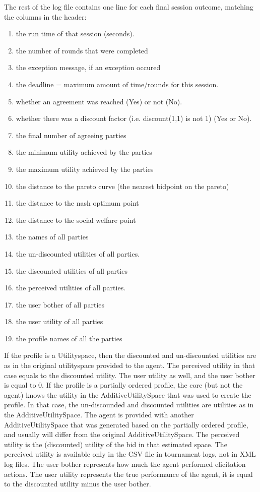 \documentclass[]{llncs}
\begin{document}
The rest of the log file contains one line for each final session outcome, matching the columns in the header:

\begin{enumerate}
\item the run time of that session (seconds). 
\item the number of rounds that were completed
\item the exception message, if an exception occured
\item the deadline = maximum amount of time/rounds for this session.
\item whether an agreement was reached (Yes) or not (No).
\item whether there was a discount factor (i.e. discount(1,1) is not 1) (Yes or No).
\item the final number of agreeing parties 
\item the minimum utility achieved by the parties
\item the maximum utility achieved by the parties
\item the distance to the pareto curve (the nearest bidpoint on the pareto)
\item the distance to the nash optimum point
\item the distance to the social welfare point
\item the names of all parties
\item the un-discounted utilities of all parties.
\item the discounted utilities of all parties
\item the perceived utilities of all parties. 
\item the user bother of all parties
\item the user utility of all parties
\item the profile names of all the parties
\end{enumerate}

If the profile is a Utilityspace, then the discounted and un-discounted utilities are as in the original utilityspace provided to the agent. The perceived utility in that case equals to the discounted utility. The user utility as well, and the user bother is equal to 0.
If the profile is a partially ordered profile, the core (but not the agent) knows the utility in the AdditiveUtilitySpace that was used to create the profile. In that case, the un-discounded and discounted utilities are utilities as in the AdditiveUtilitySpace. The agent is provided with another AdditiveUtilitySpace that was generated based on the partially ordered profile, and usually will differ from the original AdditiveUtilitySpace. The perceived utility is the (discounted) utility of the bid in that estimated space. 
The perceived utility is available only in the CSV file in tournament logs, not in XML log files. The user bother represents how much the agent performed elicitation actions. The user utility represents the true performance of the agent, it is equal to the discounted utility minus the user bother.
\end{document}
